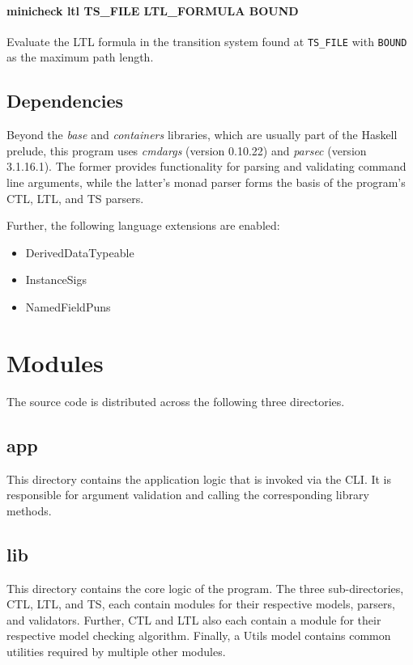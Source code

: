 \documentclass[11pt]{article}
\begin{document}
\paragraph{minicheck ltl TS\_FILE LTL\_FORMULA BOUND}
Evaluate the LTL formula in the transition system found at \verb|TS_FILE| with \verb|BOUND| as the maximum path length.

\subsection{Dependencies}

Beyond the \textit{base} and \textit{containers} libraries, which are usually part of the Haskell prelude, this program uses \textit{cmdargs} (version 0.10.22) and \textit{parsec} (version 3.1.16.1).
The former provides functionality for parsing and validating command line arguments, while the latter's monad parser forms the basis of the program's CTL, LTL, and TS parsers.

Further, the following language extensions are enabled:

\begin{itemize}
  \item DerivedDataTypeable
  \item InstanceSigs
  \item NamedFieldPuns
\end{itemize}

\section{Modules}
\label{sec:modules}

The source code is distributed across the following three directories.

\subsection{app}

This directory contains the application logic that is invoked via the CLI.
It is responsible for argument validation and calling the corresponding library methods.

\subsection{lib}

This directory contains the core logic of the program.
The three sub-directories, CTL, LTL, and TS, each contain modules for their respective models, parsers, and validators.
Further, CTL and LTL also each contain a module for their respective model checking algorithm.
Finally, a Utils model contains common utilities required by multiple other modules. 
\end{document}
